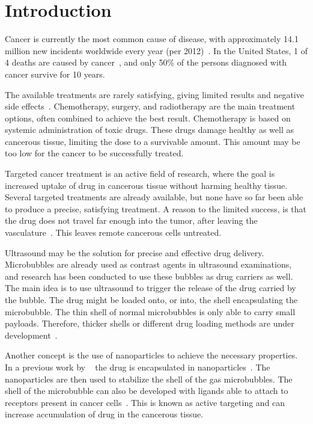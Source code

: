 \section{Introduction}

Cancer is currently the most common cause of disease, with approximately 14.1 million new incidents worldwide every year (per 2012)~\cite{cancer1}. In the United States, 1 of 4 deaths are caused by cancer~\cite{Siegel2014}, and only 50\% of the persons diagnosed with cancer survive for 10 years. 

The available treatments are rarely satisfying, giving limited results and negative side effects~\cite{doi:10.1056/NEJM200106283442607}. Chemotherapy, surgery, and radiotherapy are the main treatment options, often combined to achieve the best result. Chemotherapy is based on systemic administration of toxic drugs. These drugs damage healthy as well as cancerous tissue, limiting the dose to a survivable amount. This amount may be too low for the cancer to be successfully treated.%

Targeted cancer treatment is an active field of research, where the goal is increased uptake of drug in cancerous tissue without harming healthy tissue. Several targeted treatments are already available, but none have so far been able to produce a precise, satisfying treatment. A reason to the limited success, is that the drug does not travel far enough into the tumor, after leaving the vasculature~\cite{Bae2009}. This leaves remote cancerous cells untreated.

Ultrasound may be the solution for precise and effective drug delivery. Microbubbles are already used as contrast agents in ultrasound examinations, and research has been conducted to use these bubbles as drug carriers as well. The main idea is to use ultrasound to trigger the release of the drug carried by the bubble. The drug might be loaded onto, or into, the shell encapsulating the microbubble. The thin shell of normal microbubbles is only able to carry small payloads. Therefore, thicker shells or different drug loading methods are under development~\cite{Mayer2008}\cite{Ibsen2011}. %

Another concept is the use of nanoparticles to achieve the necessary properties. In a previous work by ~\citeauthor{Eggen2013} the drug is encapsulated in nanoparticles~\cite{Eggen2013}. The nanoparticles are then used to stabilize the shell of the gas microbubbles. The shell of the microbubble can also be developed with ligands able to attach to receptors present in cancer cells~\cite{Davis2008}. This is known as active targeting and can increase accumulation of drug in the cancerous tissue.

